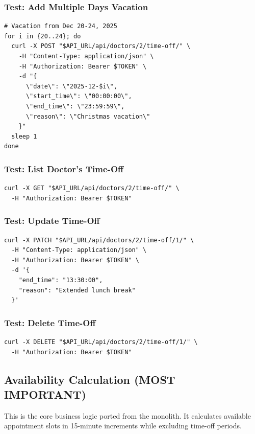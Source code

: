 \documentclass[12pt,a4paper]{article}
\begin{document}
\subsubsection{Test: Add Multiple Days Vacation}
\begin{lstlisting}[style=bash]
# Vacation from Dec 20-24, 2025
for i in {20..24}; do
  curl -X POST "$API_URL/api/doctors/2/time-off/" \
    -H "Content-Type: application/json" \
    -H "Authorization: Bearer $TOKEN" \
    -d "{
      \"date\": \"2025-12-$i\",
      \"start_time\": \"00:00:00\",
      \"end_time\": \"23:59:59\",
      \"reason\": \"Christmas vacation\"
    }"
  sleep 1
done
\end{lstlisting}

\subsubsection{Test: List Doctor's Time-Off}
\begin{lstlisting}[style=bash]
curl -X GET "$API_URL/api/doctors/2/time-off/" \
  -H "Authorization: Bearer $TOKEN"
\end{lstlisting}

\subsubsection{Test: Update Time-Off}
\begin{lstlisting}[style=bash]
curl -X PATCH "$API_URL/api/doctors/2/time-off/1/" \
  -H "Content-Type: application/json" \
  -H "Authorization: Bearer $TOKEN" \
  -d '{
    "end_time": "13:30:00",
    "reason": "Extended lunch break"
  }'
\end{lstlisting}

\subsubsection{Test: Delete Time-Off}
\begin{lstlisting}[style=bash]
curl -X DELETE "$API_URL/api/doctors/2/time-off/1/" \
  -H "Authorization: Bearer $TOKEN"
\end{lstlisting}

\subsection{Availability Calculation (MOST IMPORTANT)}

This is the core business logic ported from the monolith. It calculates available appointment slots in 15-minute increments while excluding time-off periods.
\end{document}
